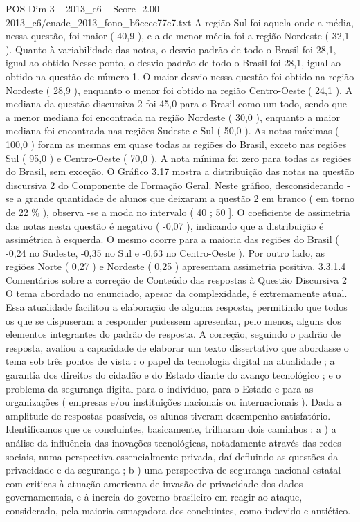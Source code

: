 \begin{textsample}{POS Dim 3 – 2013\_c6 – Score -2.00 – 2013\_c6/enade\_2013\_fono\_b6ccec77c7.txt}
A região Sul foi aquela onde a média, nessa questão, foi maior ( 40,9 ), e a de menor média foi a região Nordeste ( 32,1 ).
Quanto à variabilidade das notas, o desvio padrão de todo o Brasil foi 28,1, igual ao obtido Nesse ponto, o desvio padrão de todo o Brasil foi 28,1, igual ao obtido na questão de número 1.
O maior desvio nessa questão foi obtido na região Nordeste ( 28,9 ), enquanto o menor foi obtido na região Centro-Oeste ( 24,1 ).
A mediana da questão discursiva 2 foi 45,0 para o Brasil como um todo, sendo que a menor mediana foi encontrada na região Nordeste ( 30,0 ), enquanto a maior mediana foi encontrada nas regiões Sudeste e Sul ( 50,0 ).
As notas máximas ( 100,0 ) foram as mesmas em quase todas as regiões do Brasil, exceto nas regiões Sul ( 95,0 ) e Centro-Oeste ( 70,0 ).
A nota mínima foi zero para todas as regiões do Brasil, sem exceção.
O Gráfico 3.17 mostra a distribuição das notas na questão discursiva 2 do Componente de Formação Geral.
Neste gráfico, desconsiderando -se a grande quantidade de alunos que deixaram a questão 2 em branco ( em torno de 22 \% ), observa -se a moda no intervalo ( 40 ; 50 ].
O coeficiente de assimetria das notas nesta questão é negativo ( -0,07 ), indicando que a distribuição é assimétrica à esquerda.
O mesmo ocorre para a maioria das regiões do Brasil ( -0,24 no Sudeste, -0,35 no Sul e -0,63 no Centro-Oeste ).
Por outro lado, as regiões Norte ( 0,27 ) e Nordeste ( 0,25 ) apresentam assimetria positiva. 3.3.1.4 Comentários sobre a correção de Conteúdo das respostas à Questão Discursiva 2 O tema abordado no enunciado, apesar da complexidade, é extremamente atual.
Essa atualidade facilitou a elaboração de alguma resposta, permitindo que todos os que se dispuseram a responder pudessem apresentar, pelo menos, alguns dos elementos integrantes do padrão de resposta.
A correção, seguindo o padrão de resposta, avaliou a capacidade de elaborar um texto dissertativo que abordasse o tema sob três pontos de vista : o papel da tecnologia digital na atualidade ; a garantia dos direitos do cidadão e do Estado diante do avanço tecnológico ; e o problema da segurança digital para o indivíduo, para o Estado e para as organizações ( empresas e/ou instituições nacionais ou internacionais ).
Dada a amplitude de respostas possíveis, os alunos tiveram desempenho satisfatório.
Identificamos que os concluintes, basicamente, trilharam dois caminhos : a ) a análise da influência das inovações tecnológicas, notadamente através das redes sociais, numa perspectiva essencialmente privada, daí defluindo as questões da privacidade e da segurança ; b ) uma perspectiva de segurança nacional-estatal com criticas à atuação americana de invasão de privacidade dos dados governamentais, e à inercia do governo brasileiro em reagir ao ataque, considerado, pela maioria esmagadora dos concluintes, como indevido e antiético.

\end{textsample}
